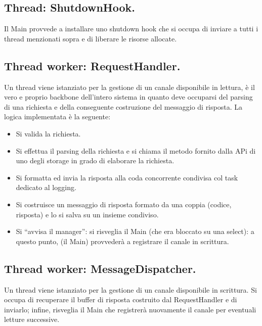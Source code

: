 \documentclass[11pt, italian, openany]{book}
\begin{document}
\begin{sloppypar}
\subsection*{Thread: ShutdownHook.}
Il Main provvede a installare uno shutdown hook che si occupa di inviare  a tutti i thread menzionati sopra e di
liberare le risorse allocate.

\subsection*{Thread worker: RequestHandler.}
Un thread  viene istanziato per la gestione di un canale disponibile in lettura,
\`e il vero e proprio backbone dell'intero sistema in quanto deve occuparsi del parsing di una richiesta e della conseguente costruzione
del messaggio di risposta. La logica implementata \`e la seguente:
\begin{itemize}[itemsep=0pt, parsep=0pt, topsep=0pt]
	\item Si valida la richiesta.
	\item Si effettua il parsing della richiesta e si chiama il metodo fornito dalla APi di uno degli storage in grado di elaborare la
	richiesta.
	\item Si formatta ed invia la risposta alla coda concorrente condivisa col task dedicato al logging.
	\item Si costruisce un messaggio di risposta formato da una coppia (codice, risposta) e lo si salva su un insieme condiviso.
	\item Si ``avvisa il manager'': si risveglia il Main (che era bloccato su una select): a questo punto, (il Main) provveder\`a a
	registrare il canale in scrittura.
\end{itemize}

\subsection*{Thread worker: MessageDispatcher.}
Un thread  viene istanziato per la gestione di un canale disponibile in
scrittura. Si occupa di recuperare il buffer di risposta costruito dal RequestHandler e di inviarlo; infine, risveglia il Main che
registrer\`a nuovamente il canale per eventuali letture successive.


\end{sloppypar}
\end{document}
